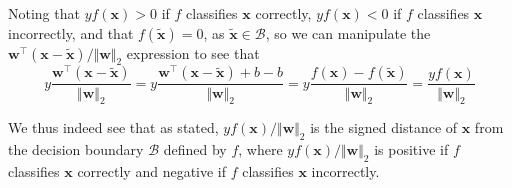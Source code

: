 \documentclass{article}
\numberwithin{equation}{section}
\begin{document}
Noting that $ yf(\mathbf{x}) > 0 $ if $ f $ classifies $ \mathbf{x} $
correctly, $ yf(\mathbf{x}) < 0 $ if $ f $ classifies $ \mathbf{x} $
incorrectly, and that $ f(\tilde{\mathbf{x}}) = 0 $, as
$ \tilde{\mathbf{x}} \in \mathcal{B} $, so we can manipulate the
$ \mathbf{w}^\top(\mathbf{x} - \tilde{\mathbf{x}}) / \Vert\mathbf{w}\Vert_2 $
expression to see that
\begin{equation*}
    y\frac{
        \mathbf{w}^\top(\mathbf{x} - \tilde{\mathbf{x}})
    }{
        \Vert\mathbf{w}\Vert_2
    } =
    y\frac{
        \mathbf{w}^\top(\mathbf{x} - \tilde{\mathbf{x}}) + b - b
    }{
        \Vert\mathbf{w}\Vert_2
    } =
    y\frac{f(\mathbf{x}) - f(\tilde{\mathbf{x}})}{\Vert\mathbf{w}\Vert_2} =
    \frac{yf(\mathbf{x})}{\Vert\mathbf{w}\Vert_2}
\end{equation*}

We thus indeed see that as stated, $ yf(\mathbf{x}) / \Vert\mathbf{w}\Vert_2 $
is the signed distance of $ \mathbf{x} $ from the decision boundary
$ \mathcal{B} $ defined by $ f $, where
$ yf(\mathbf{x}) / \Vert\mathbf{w}\Vert_2 $ is positive if $ f $ classifies
$ \mathbf{x} $ correctly and negative if $ f $ classifies $ \mathbf{x} $
incorrectly.

\end{document}
